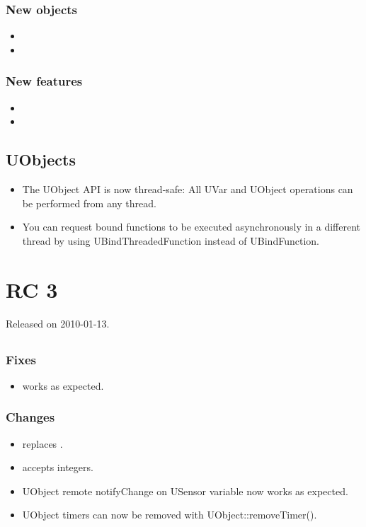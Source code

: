 \subsubsection{New objects}
\begin{itemize}
\item {}
\item {}
\end{itemize}

\subsubsection{New features}
\begin{itemize}
\item {}
\item {}
\end{itemize}

\subsection{UObjects}

\begin{itemize}
\item The UObject API is now thread-safe: All UVar and UObject
  operations can be performed from any thread.
\item You can request bound functions to be executed asynchronously in
  a different thread by using UBindThreadedFunction instead of
  UBindFunction.
\end{itemize}


\section{ RC 3}
Released on 2010-01-13.

\subsection{\us}

\subsubsection{Fixes}
\begin{itemize}
\item {} works as expected.
\end{itemize}

\subsubsection{Changes}
\begin{itemize}
\item {} replaces .
\item {} accepts integers.
\item UObject remote notifyChange on USensor variable now works as expected.
\item UObject timers can now be removed with UObject::removeTimer().
\end{itemize}

